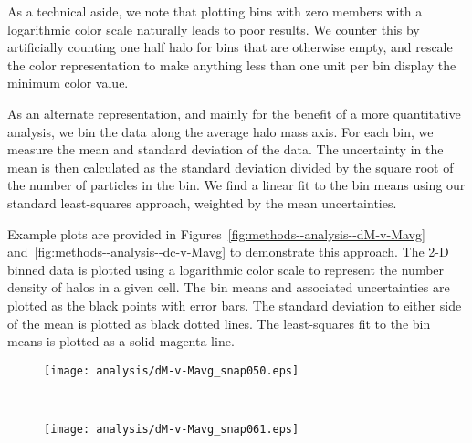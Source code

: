 As a technical aside, we note that plotting bins with zero members with a logarithmic color scale naturally leads to poor results.  We counter this by artificially counting one half halo for bins that are otherwise empty, and rescale the color representation to make anything less than one unit per bin display the minimum color value.

As an alternate representation, and mainly for the benefit of a more quantitative analysis, we bin the data along the average halo mass axis.  For each bin, we measure the mean and standard deviation of the data.  The uncertainty in the mean is then calculated as the standard deviation divided by the square root of the number of particles in the bin.  We find a linear fit to the bin means using our standard least-squares approach, weighted by the mean uncertainties.

Example plots are provided in Figures~\ref{fig:methods--analysis--dM-v-Mavg} and~\ref{fig:methods--analysis--dc-v-Mavg} to demonstrate this approach.  The 2-D binned data is plotted using a logarithmic color scale to represent the number density of halos in a given cell.  The bin means and associated uncertainties are plotted as the black points with error bars.  The standard deviation to either side of the mean is plotted as black dotted lines.  The least-squares fit to the bin means is plotted as a solid magenta line.

\begin{figure*}[tp]
	\centering
	\begin{subfigure}{}
		\texttt{[image: analysis/dM-v-Mavg\_snap050.eps]}
	\end{subfigure}
	\\
	\begin{subfigure}{}
		\texttt{[image: analysis/dM-v-Mavg\_snap061.eps]}
	\end{subfigure}
	\caption[$\Delta M_{\mathrm{vir}}$ as a function of $M_{\mathrm{vir,avg}}$]{\footnotesize $\Delta M_{\mathrm{vir}}$ as a function of $M_{\mathrm{vir,avg}}$.  For the 2-D color histogram, halos are counted in rectangular bins and smoothed with a Gaussian kernel with a logarithmic color scale.  The halos are also divided into logarithmically-spaced bins in average virial mass, and the mean for each bin is plotted as a black point.  The black dotted curves are the standard deviation around the mean.  The magenta line is the linear least-squares best fit to the bin means.  The light grey dashed line at $\Delta q = 0$ is provided to guide the eye.  The two panels correspond to snapshots at $z = 10.3$ and $z = 6.0$.  These plots are provided as examples of the output at this stage of the analysis and are further discussed in Chapter~\ref{chap:2lpt}.}
	\label{fig:methods--analysis--dM-v-Mavg}
\end{figure*}

